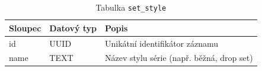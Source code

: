 \begin{table}[ht!]
    \centering
    \begin{tabularx}{\textwidth}{|l|l|L|}
        \hline
        \textbf{Sloupec} & \textbf{Datový typ} & \textbf{Popis}                            \\ \hline
        id               & UUID                & Unikátní identifikátor záznamu            \\ \hline
        name             & TEXT                & Název stylu série (např. běžná, drop set) \\ \hline
    \end{tabularx}
    \caption{Tabulka \texttt{set\_style}}
    \label{tab:set_style}
\end{table}
